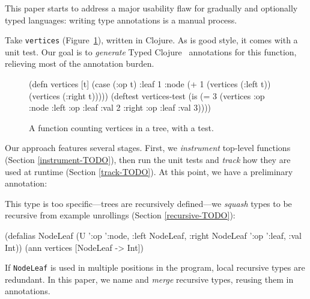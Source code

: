 

This paper starts to address a major usability flaw
for gradually and optionally typed languages:
writing type annotations is a manual process.

Take \texttt{vertices} (Figure~\ref{vertices}),
written in Clojure.
As is good style, it comes with a unit test.
Our goal is to \textit{generate} Typed Clojure~\cite{bonnaire2016practical}
annotations
for this function, relieving most of the annotation
burden.

\begin{figure}
\begin{cljlisting}
(defn vertices [t]
  (case (:op t)
    :leaf 1
    :node (+ 1 (vertices (:left t))
               (vertices (:right t)))))
(deftest vertices-test
  (is (= 3 (vertices {:op :node 
                      :left {:op :leaf :val 2}
                      :right {:op :leaf :val 3}}))))
\end{cljlisting}
\caption{A function counting vertices in a tree, with a test.}
\label{vertices}
\end{figure}

Our approach features several stages.
First, we \textit{instrument} top-level functions
(Section \ref{instrument-TODO}),
then run the unit tests and \textit{track}
how they are used at runtime
(Section \ref{track-TODO}).
At this point, we have a preliminary
annotation:

\begin{cljlisting}
(ann vertices ['{:op ':node,
                 :left '{:op ':leaf,
                         :val Int},
                 :right '{:op ':leaf,
                          :val Int}}
               -> Int]})
\end{cljlisting}

This type is too specific---trees are recursively
defined---we \textit{squash} types to be
recursive from example unrollings (Section \ref{recursive-TODO}):

\begin{cljlisting}
(defalias NodeLeaf 
  (U '{:op ':node, :left NodeLeaf, :right NodeLeaf}
     '{:op ':leaf, :val Int}))
(ann vertices [NodeLeaf -> Int])
\end{cljlisting}

%
If \texttt{NodeLeaf} is used in multiple positions
in the program, local recursive types are redundant.
In this paper, we name and \textit{merge} recursive
types, reusing them in annotations.
 
